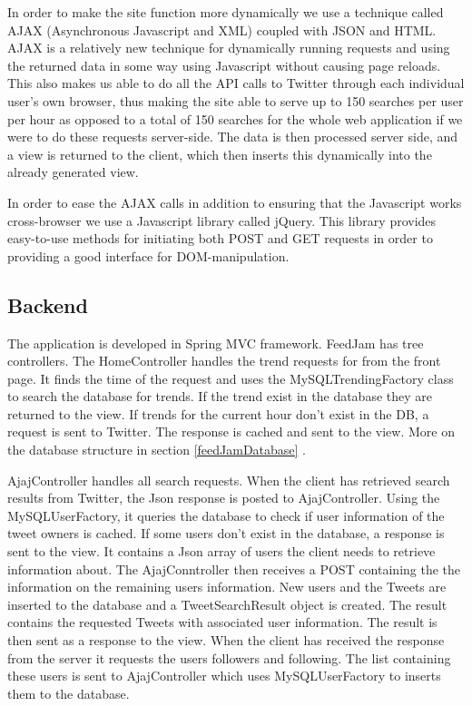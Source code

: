 In order to make the site function more dynamically we use a technique called AJAX (Asynchronous Javascript and XML) coupled with JSON and HTML. AJAX is a relatively new technique for dynamically running requests and using the returned data in some way using Javascript without causing page reloads. This also makes us able to do all the API calls to Twitter through each individual user's own browser, thus making the site able to serve up to 150 searches per user per hour as opposed to a total of 150 searches for the whole web application if we were to do these requests server-side. The data is then processed server side, and a view is returned to the client, which then inserts this dynamically into the already generated view.

In order to ease the AJAX calls in addition to ensuring that the Javascript works cross-browser we use a Javascript library called jQuery. This library provides easy-to-use methods for initiating both POST and GET requests in order to providing a good interface for DOM-manipulation.


\subsection{Backend} %
The application is developed in Spring MVC framework. FeedJam has tree controllers. The HomeController handles the trend requests for from the front page. It finds the time of the request and uses the MySQLTrendingFactory class to search the database for trends. If the trend exist in the database they are returned to the view. If trends for the current hour don't exist in the DB, a request is sent to Twitter. The response is cached and sent to the view. More on the database structure in section \ref{feedJamDatabase} .

AjajController handles all search requests. When the client has retrieved search results from Twitter, the Json response is posted to AjajController. Using the MySQLUserFactory, it queries the database to check if user information of the tweet owners is cached. If some users don't exist in the database, a response is sent to the view. It contains a Json array of users the client needs to retrieve information about. 
The AjajConntroller then receives a POST containing the the information on the remaining users information. New users and the Tweets are inserted to the database and a TweetSearchResult object is created. The result contains the requested Tweets with associated user information. The result is then sent as a response to the view. When the client has received the response from the server it requests the users followers and following. The list containing these users is sent to AjajController which uses MySQLUserFactory to inserts them to the database. 

